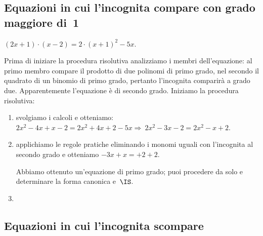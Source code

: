 
\subsection{Equazioni in cui l'incognita compare con grado maggiore di~1}

\begin{exrig}\vspace{1.10ex}
 \begin{esempio}

$(2x+1)\cdot (x-2)=2\cdot (x+1)^{2}-5x$.

Prima di iniziare la procedura risolutiva analizziamo i membri
dell'equazione: al primo membro compare il prodotto
di due polinomi di primo grado, nel secondo il quadrato di un binomio
di primo grado, pertanto l'incognita comparirà a grado due. Apparentemente
l'equazione è di secondo grado. Iniziamo la procedura
risolutiva:

\begin{enumerate}
 \item svolgiamo i calcoli e otteniamo:
$2x^{2}-4x+x-2=2x^{2}+4x+2-5x\Rightarrow~2x^{2}-3x-2=2x^{2}-x+2.$
 \item applichiamo le regole pratiche eliminando i monomi
uguali con l'incognita al secondo grado e otteniamo
$-3x+x=+2+2$.

Abbiamo ottenuto un'equazione di primo grado; puoi
procedere da solo e determinare la forma canonica e~$\IS$.
 \item \dotfill
\end{enumerate}

 \end{esempio}

\end{exrig}


\subsection{Equazioni in cui l'incognita scompare}

